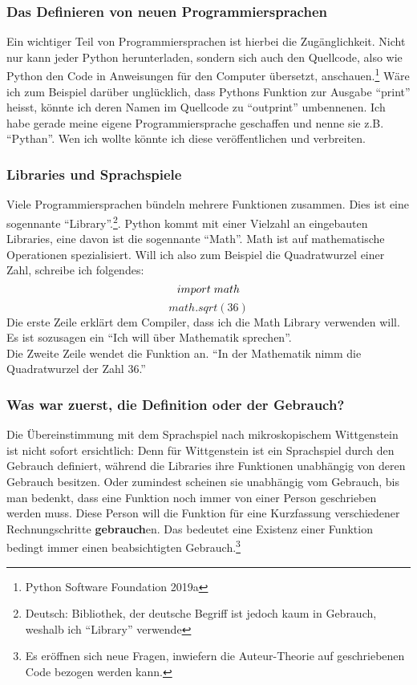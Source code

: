 \documentclass[10pt,a4paper]{article}
\begin{document}
\subsubsection{Das Definieren von neuen Programmiersprachen}
Ein wichtiger Teil von Programmiersprachen ist hierbei die Zugänglichkeit. Nicht nur kann jeder Python herunterladen, sondern sich auch den Quellcode, also wie Python den Code in Anweisungen für den Computer übersetzt, anschauen.\footnote{Python Software Foundation 2019a} Wäre ich zum Beispiel darüber unglücklich, dass Pythons Funktion zur Ausgabe \enquote{print} heisst, könnte ich deren Namen im Quellcode zu \enquote{outprint} umbennenen. Ich habe gerade meine eigene Programmiersprache geschaffen und nenne sie z.B. \enquote{Pythan}. Wen ich wollte könnte ich diese veröffentlichen und verbreiten.

\subsubsection{Libraries und Sprachspiele}
Viele Programmiersprachen bündeln mehrere Funktionen zusammen. Dies ist eine sogennante \enquote{Library}.\footnote{Deutsch: Bibliothek, der deutsche Begriff ist jedoch kaum in Gebrauch, weshalb ich \enquote{Library} verwende}. Python kommt mit einer Vielzahl an eingebauten Libraries, eine davon ist die sogennante \enquote{Math}. Math ist auf mathematische Operationen spezialisiert. Will ich also zum Beispiel die Quadratwurzel einer Zahl, schreibe ich folgendes:
$$import \hspace{1mm} math$$
$$math.sqrt(36)$$
Die erste Zeile erklärt dem Compiler, dass ich die Math Library verwenden will. Es ist sozusagen ein \enquote{Ich will über Mathematik sprechen}. \\
Die Zweite Zeile wendet die Funktion an. \enquote{In der Mathematik nimm die Quadratwurzel der Zahl 36.} \\

\subsubsection{Was war zuerst, die Definition oder der Gebrauch?}
Die Übereinstimmung mit dem Sprachspiel nach mikroskopischem Wittgenstein ist nicht sofort ersichtlich: Denn für Wittgenstein ist ein Sprachspiel durch den Gebrauch definiert, während die Libraries ihre Funktionen unabhängig von deren Gebrauch besitzen. Oder zumindest scheinen sie unabhängig vom Gebrauch, bis man bedenkt, dass eine Funktion noch immer von einer Person geschrieben werden muss. Diese Person will die Funktion für eine Kurzfassung verschiedener Rechnungschritte \textbf{gebrauch}en. Das bedeutet eine Existenz einer Funktion bedingt immer einen beabsichtigten Gebrauch.\footnote{Es eröffnen sich neue Fragen, inwiefern die Auteur-Theorie auf geschriebenen Code bezogen werden kann.}
\end{document}
